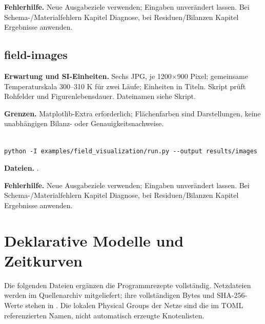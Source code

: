 \textbf{Fehlerhilfe.} Neue Ausgabeziele verwenden; Eingaben unverändert lassen. Bei Schema-/Materialfehlern Kapitel Diagnose, bei Residuen/Bilanzen Kapitel Ergebnisse anwenden.



\section{field-images}\label{recipe:field-images}

\textbf{Erwartung und SI-Einheiten.} Sechs JPG, je 1200$\times$900 Pixel; gemeinsame Temperaturskala 300–310 K für zwei Läufe; Einheiten in Titeln. Skript prüft Rohfelder und Figurenlebensdauer. Dateinamen siehe Skript.

\textbf{Grenzen.} Matplotlib-Extra erforderlich; Flächenfarben sind Darstellungen, keine unabhängigen Bilanz- oder Genauigkeitsnachweise.

\begin{lstlisting}

python -I examples/field_visualization/run.py --output results/images

\end{lstlisting}

\textbf{Dateien.} .

\textbf{Fehlerhilfe.} Neue Ausgabeziele verwenden; Eingaben unverändert lassen. Bei Schema-/Materialfehlern Kapitel Diagnose, bei Residuen/Bilanzen Kapitel Ergebnisse anwenden.



\chapter{Deklarative Modelle und Zeitkurven}\label{sec:app-inputs}

Die folgenden Dateien ergänzen die Programmrezepte vollständig. Netzdateien werden im Quellenarchiv mitgeliefert; ihre vollständigen Bytes und SHA-256-Werte stehen in . Die lokalen Physical Groups der Netze sind die im TOML referenzierten Namen, nicht automatisch erzeugte Knotenlisten.

\section*{}



